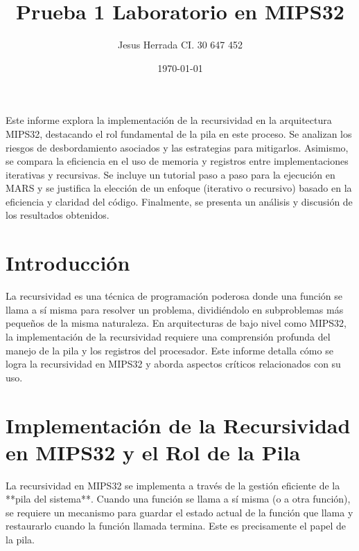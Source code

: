 \documentclass{article}
\title{Prueba 1 Laboratorio en MIPS32}
\author{Jesus Herrada CI. 30 647 452 }
\date{\today}
\begin{document}
\maketitle


Este informe explora la implementación de la recursividad en la arquitectura MIPS32, destacando el rol fundamental de la pila en este proceso. Se analizan los riesgos de desbordamiento asociados y las estrategias para mitigarlos. Asimismo, se compara la eficiencia en el uso de memoria y registros entre implementaciones iterativas y recursivas. Se incluye un tutorial paso a paso para la ejecución en MARS y se justifica la elección de un enfoque (iterativo o recursivo) basado en la eficiencia y claridad del código. Finalmente, se presenta un análisis y discusión de los resultados obtenidos.


\section{Introducción}
La recursividad es una técnica de programación poderosa donde una función se llama a sí misma para resolver un problema, dividiéndolo en subproblemas más pequeños de la misma naturaleza. En arquitecturas de bajo nivel como MIPS32, la implementación de la recursividad requiere una comprensión profunda del manejo de la pila y los registros del procesador. Este informe detalla cómo se logra la recursividad en MIPS32 y aborda aspectos críticos relacionados con su uso.

\section{Implementación de la Recursividad en MIPS32 y el Rol de la Pila}

La recursividad en MIPS32 se implementa a través de la gestión eficiente de la **pila del sistema**. Cuando una función se llama a sí misma (o a otra función), se requiere un mecanismo para guardar el estado actual de la función que llama y restaurarlo cuando la función llamada termina. Este es precisamente el papel de la pila.
\end{document}
